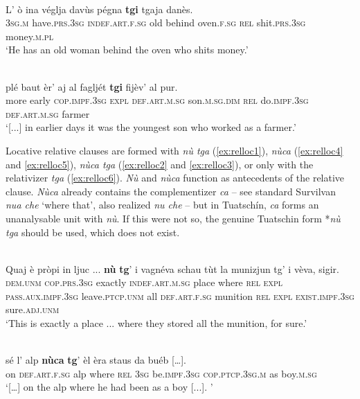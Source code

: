 \ea

\\
\gll L' ò ina véglja davùs pégna \textbf{tgi} tgaja danès.\\
\textsc{3sg.m} have.\textsc{prs.3sg} \textsc{indef.art.f.sg} old behind oven.\textsc{f.sg} \textsc{rel} shit.\textsc{prs.3sg} money.\textsc{m.pl}\\
\glt `He has an old woman behind the oven who shits money.'
\z

\ea

\\
\gll  [...] plé baut èr’ aj al fagljét \textbf{tgi} fijèv’ al pur. \\
{} more early \textsc{cop.impf.3sg} \textsc{expl} \textsc{def.art.m.sg}  son.\textsc{m.sg.dim} \textsc{rel} do.\textsc{impf.3sg} \textsc{def.art.m.sg} farmer \\
\glt `[...] in earlier days it was the youngest son who worked as a farmer.'
\z

Locative relative clauses are formed with \textit{nù tga} (\ref{ex:relloc1}), \textit{nùca} (\ref{ex:relloc4} and \ref{ex:relloc5}), \textit{nùca tga} (\ref{ex:relloc2} and \ref{ex:relloc3}), or only with the relativizer \textit{tga} (\ref{ex:relloc6}). \textit{Nù} and \textit{nùca} function as antecedents of the relative clause. \textit{Nùca} already contains the complementizer \textit{ca} –  see standard Survilvan \textit{nua che} ‘where that’, also realized \textit{nu che} – but in Tuatschín, \textit{ca} forms an unanalysable unit with \textit{nù}. If this were not so, the genuine Tuatschin form *\textit{nù tga} should be used, which does not exist.

\ea
\label{ex:relloc1}
\\
\gll  Quaj è pròpi in ljuc ... \textbf{nù} \textbf{tg}’ i vagnéva schau tùt la munizjun tg’ i vèva, sigir.\\
\textsc{dem.unm} \textsc{cop.prs.3sg} exactly \textsc{indef.art.m.sg} place {} where \textsc{rel} \textsc{expl} \textsc{pass.aux.impf.3sg} leave.\textsc{ptcp.unm} all \textsc{def.art.f.sg} munition \textsc{rel} \textsc{expl} \textsc{exist.impf.3sg} sure.\textsc{adj.unm}\\
\glt `This is exactly a place ... where they stored all the munition, for sure.'
\z

\ea
\label{ex:relloc2}
\\
\gll   […] sé l’ alp \textbf{nùca} \textbf{tg}’ èl èra staus da buéb […]. \\
     {}  on \textsc{def.art.f.sg} alp where \textsc{rel} \textsc{3sg} be.\textsc{impf.3sg} \textsc{cop.ptcp.3sg.m} as boy.\textsc{m.sg} \\
\glt `[…] on the alp where he had been as a boy [...]. '
\z


